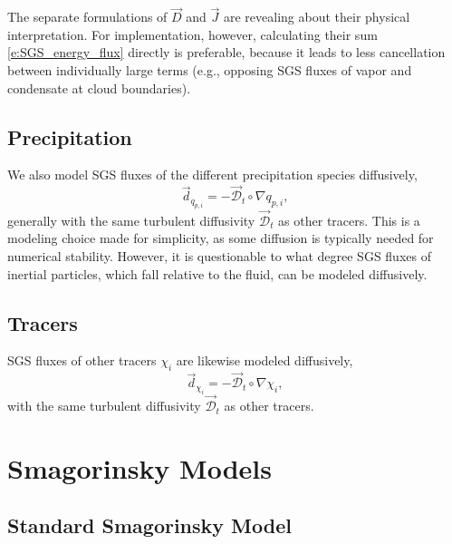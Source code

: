 \documentclass{report}
\begin{document}
The separate formulations of $\vec{D}$ and $\vec{J}$ are revealing about their physical interpretation. For implementation, however, calculating their sum \eqref{e:SGS_energy_flux} directly is preferable, because it leads to less cancellation between individually large terms (e.g., opposing SGS fluxes of vapor and condensate at cloud boundaries).

\subsection{Precipitation}

We also model SGS fluxes of the different precipitation species diffusively,
\begin{equation}\label{eq:sgs-precip-flux}
\vec{d}_{q_{p, i}} = - \vec{\mathcal{D}}_t \circ \nabla q_{p, i},
\end{equation}
generally with the same turbulent diffusivity $\vec{\mathcal{D}}_t$ as other tracers. This is a modeling choice made for simplicity, as some diffusion is typically needed for numerical stability. However, it is questionable to what degree SGS fluxes of inertial particles, which fall relative to the fluid, can be modeled diffusively.

\subsection{Tracers}

SGS fluxes of other tracers $\chi_i$ are likewise modeled diffusively,
\begin{equation}\label{eq:sgs-tracer-flux}
\vec{d}_{\chi_i} = - \vec{\mathcal{D}}_t \circ \nabla \chi_i,
\end{equation}
with the same turbulent diffusivity $\vec{\mathcal{D}}_t$ as other tracers.

\section{Smagorinsky Models}

\subsection{Standard Smagorinsky Model}
\end{document}
